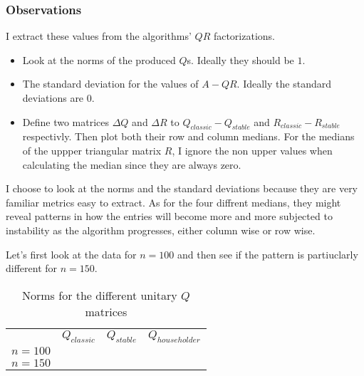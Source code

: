 \documentclass[a4paper,11pt]{article}
\begin{document}
\subsubsection{Observations}

I extract these values from the algorithms' $QR$ factorizations.

\begin{itemize}
  \item Look at the norms of the produced $Q$s. Ideally they should be $1$.
  \item The standard deviation for the values of $A-QR$. Ideally the
    standard deviations are $0$.
  \item Define two matrices $\Delta Q$ and $\Delta R$ to $Q_{classic} -
    Q_{stable}$ and $R_{classic} - R_{stable}$ respectivly. Then plot both
    their row and column medians. For the medians of the uppper
    triangular matrix $R$, I ignore the non upper values when
    calculating the median since they are always zero.

\end{itemize}

I choose to look at the norms and the standard deviations because they
are very familiar metrics easy to extract. As for the four diffrent
medians, they might reveal patterns in how the entries will
become more and more subjected to instability as the algorithm
progresses, either column wise or row wise.

Let's first look at the data for $n=100$ and then see if
the pattern is partiuclarly different for $n=150$.

\begin{table}[h]
  \begin{tabular}{r|c|c|c|}
    \multicolumn{1}{r}{}
     & \multicolumn{1}{c}{$Q_{classic}$ }
     & \multicolumn{1}{c}{$Q_{stable}$}
     & \multicolumn{1}{c}{$Q_{householder}$} \\
    \cline{2-4}
    $n=100$ & 
            & 
            & 
            \\ \cline{2-4}
    $n=150$ & 
            & 
            & 
            \\ \cline{2-4}
  \end{tabular}
  \caption{Norms for the different unitary $Q$ matrices}
  \label{tab:norms}
\end{table}
\end{document}
